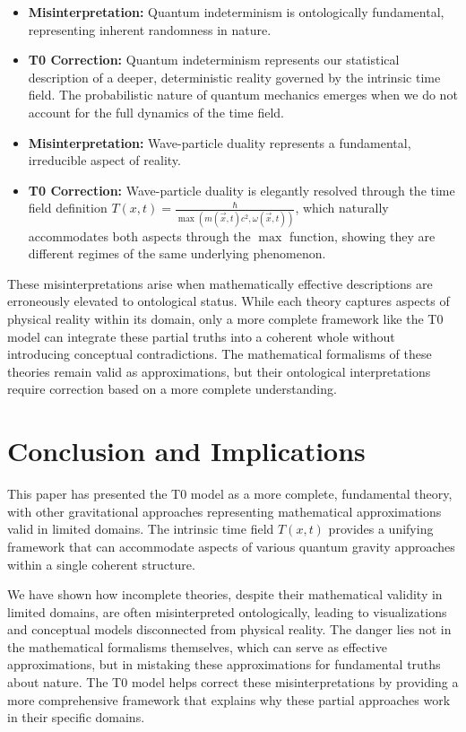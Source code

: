 \documentclass[12pt,a4paper]{article}
\newcommand{\Tfieldt}{T(x,t)}
\newcommand{\vecx}{\vec{x}}
\begin{document}
	\begin{itemize}
		\item \textbf{Misinterpretation:} Quantum indeterminism is ontologically fundamental, representing inherent randomness in nature.
		\item \textbf{T0 Correction:} Quantum indeterminism represents our statistical description of a deeper, deterministic reality governed by the intrinsic time field. The probabilistic nature of quantum mechanics emerges when we do not account for the full dynamics of the time field.
		
		\item \textbf{Misinterpretation:} Wave-particle duality represents a fundamental, irreducible aspect of reality.
		\item \textbf{T0 Correction:} Wave-particle duality is elegantly resolved through the time field definition $\Tfieldt = \frac{\hbar}{\max(m(\vecx,t)c^2, \omega(\vecx,t))}$, which naturally accommodates both aspects through the $\max$ function, showing they are different regimes of the same underlying phenomenon.
	\end{itemize}
	
	These misinterpretations arise when mathematically effective descriptions are erroneously elevated to ontological status. While each theory captures aspects of physical reality within its domain, only a more complete framework like the T0 model can integrate these partial truths into a coherent whole without introducing conceptual contradictions. The mathematical formalisms of these theories remain valid as approximations, but their ontological interpretations require correction based on a more complete understanding.
	
	\section{Conclusion and Implications}
	\label{sec:conclusion}
	
	This paper has presented the T0 model as a more complete, fundamental theory, with other gravitational approaches representing mathematical approximations valid in limited domains. The intrinsic time field $\Tfieldt$ provides a unifying framework that can accommodate aspects of various quantum gravity approaches within a single coherent structure.
	
	We have shown how incomplete theories, despite their mathematical validity in limited domains, are often misinterpreted ontologically, leading to visualizations and conceptual models disconnected from physical reality. The danger lies not in the mathematical formalisms themselves, which can serve as effective approximations, but in mistaking these approximations for fundamental truths about nature. The T0 model helps correct these misinterpretations by providing a more comprehensive framework that explains why these partial approaches work in their specific domains.
	
\end{document}
